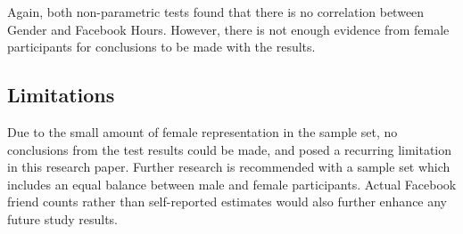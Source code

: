 Again, both non-parametric tests found that there is no correlation between Gender and Facebook Hours. However, there is not enough evidence from female participants for conclusions to be made with the results.

\subsection{Limitations}

Due to the small amount of female representation in the sample set, no conclusions from the test results could be made, and posed a recurring limitation in this research paper. Further research is recommended with a sample set which includes an equal balance between male and female participants. Actual Facebook friend counts rather than self-reported estimates would also further enhance any future study results.